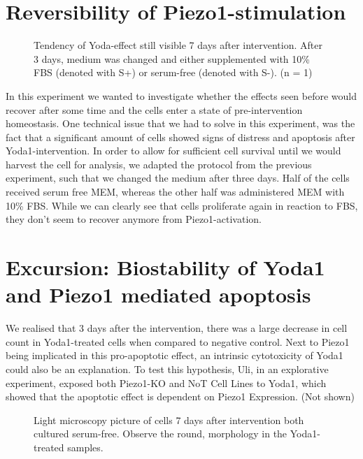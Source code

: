 \section{Reversibility of Piezo1-stimulation}


\begin{figure}
    \centering
    
    \caption{Tendency of Yoda-effect still visible 7 days after intervention. After 3 days, medium was changed and either supplemented with 10\% FBS (denoted with S+) or serum-free (denoted with S-). (n = 1)}
    \label{fig:my_label}
\end{figure}

In this experiment we wanted to investigate whether the effects seen before would recover after some time and the cells enter a state of pre-intervention homeostasis. One technical issue that we had to solve in this experiment, was the fact that a significant amount of cells showed signs of distress and apoptosis after Yoda1-intervention. In order to allow for sufficient cell survival until we would harvest the cell for analysis, we adapted the protocol from the previous experiment, such that we changed the medium after three days. Half of the cells received serum free MEM\textalpha{}, whereas the other half was administered MEM\textalpha{} with 10\% FBS. 
While we can clearly see that cells proliferate again in reaction to FBS, they don't seem to recover anymore from Piezo1-activation. 

\section{Excursion: Biostability of Yoda1 and Piezo1 mediated apoptosis}
\label{sec:biostability}
We realised that 3 days after the intervention, there was a large decrease in cell count in Yoda1-treated cells when compared to negative control. Next to Piezo1 being implicated in this pro-apoptotic effect, an intrinsic cytotoxicity of Yoda1 could also be an explanation. To test this hypothesis, Uli, in an explorative experiment, exposed both Piezo1-KO and NoT Cell Lines to Yoda1, which showed that the apoptotic effect is dependent on Piezo1 Expression. (Not shown)

\begin{figure}
    \centering
    
    \caption{Light microscopy picture of cells 7 days after intervention both cultured serum-free. Observe the round,  morphology in the Yoda1-treated samples.}
    \label{fig:yoda_apop}
\end{figure}